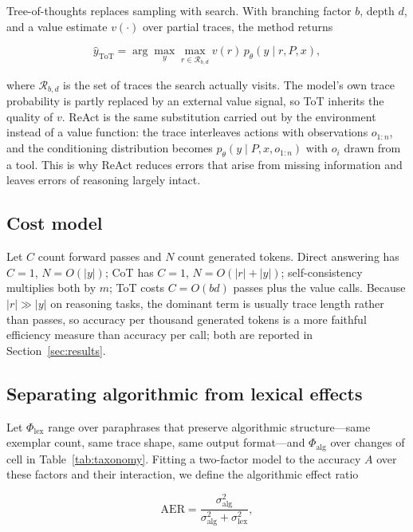 \documentclass[conference]{IEEEtran}
\begin{document}
Tree-of-thoughts replaces sampling with search.  With branching factor
$b$, depth $d$, and a value estimate $v(\cdot)$ over partial traces,
the method returns

\begin{equation}
\hat{y}_{\mathrm{ToT}} = \arg\max_{y} \max_{r \in \mathcal{R}_{b,d}} v(r) \, p_{\theta}(y \mid r, P, x),
\label{eq:tot}
\end{equation}

where $\mathcal{R}_{b,d}$ is the set of traces the search actually
visits.  The model's own trace probability is partly replaced by an
external value signal, so ToT inherits the quality of $v$.  ReAct is
the same substitution carried out by the environment instead of a
value function: the trace interleaves actions with observations
$o_{1:n}$, and the conditioning distribution becomes
$p_{\theta}(y \mid P, x, o_{1:n})$ with $o_{i}$ drawn from a tool.
This is why ReAct reduces errors that arise from missing information
and leaves errors of reasoning largely intact.

\subsection{Cost model}
\label{sec:cost-model}

Let $C$ count forward passes and $N$ count generated tokens.  Direct
answering has $C = 1$, $N = O(|y|)$; CoT has $C = 1$, $N = O(|r| +
|y|)$; self-consistency multiplies both by $m$; ToT costs $C =
O(bd)$ passes plus the value calls.  Because $|r| \gg |y|$ on
reasoning tasks, the dominant term is usually trace length rather
than passes, so accuracy per thousand generated tokens is a more
faithful efficiency measure than accuracy per call; both are reported
in Section~\ref{sec:results}.

\subsection{Separating algorithmic from lexical effects}
\label{sec:aer}

Let $\Phi_{\mathrm{lex}}$ range over paraphrases that preserve
algorithmic structure---same exemplar count, same trace shape, same
output format---and $\Phi_{\mathrm{alg}}$ over changes of cell in
Table~\ref{tab:taxonomy}.  Fitting a two-factor model to the accuracy
$A$ over these factors and their interaction, we define the
algorithmic effect ratio

\begin{equation}
\mathrm{AER} = \frac{\sigma_{\mathrm{alg}}^{2}}{\sigma_{\mathrm{alg}}^{2} + \sigma_{\mathrm{lex}}^{2}},
\label{eq:aer}
\end{equation}
\end{document}
